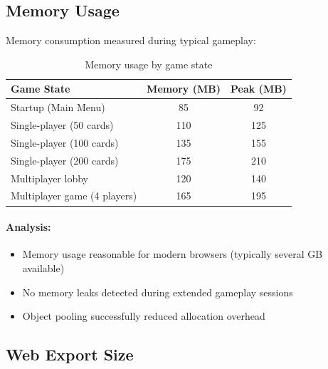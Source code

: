 \subsection{Memory Usage}
\label{subsec:memory}

Memory consumption measured during typical gameplay:

\begin{table}[htbp]
    \centering
    \caption{Memory usage by game state}
    \label{tab:memory-usage}
    \begin{tabular}{@{}lcc@{}}
        \toprule
        \textbf{Game State}          & \textbf{Memory (MB)} & \textbf{Peak (MB)} \\
        \midrule
        Startup (Main Menu)          & 85                   & 92                 \\
        Single-player (50 cards)     & 110                  & 125                \\
        Single-player (100 cards)    & 135                  & 155                \\
        Single-player (200 cards)    & 175                  & 210                \\
        Multiplayer lobby            & 120                  & 140                \\
        Multiplayer game (4 players) & 165                  & 195                \\
        \bottomrule
    \end{tabular}
\end{table}

\paragraph*{Analysis:}

\begin{itemize}
    \item Memory usage reasonable for modern browsers (typically several GB available)
    \item No memory leaks detected during extended gameplay sessions
    \item Object pooling successfully reduced allocation overhead
\end{itemize}

\subsection{Web Export Size}
\label{subsec:export-size}

